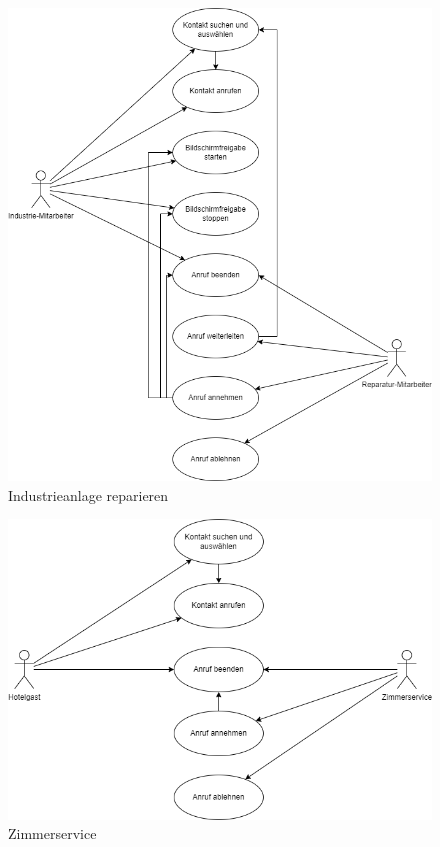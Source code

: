 \begin{figure}[ht!]
    \includegraphics[width=\paperwidth-2in]{../assets/img/UML-Anwendungsfalldiagramme-Industrieanlage reparieren.drawio}
    \caption{Industrieanlage reparieren}
    \label{fig:industrieanlage-reparieren}
\end{figure}

\begin{figure}[ht!]
    \includegraphics[width=\paperwidth-2in]{../assets/img/UML-Anwendungsfalldiagramme-Zimmerservice.drawio}
    \caption{Zimmerservice}
    \label{fig:zimmerservice}
\end{figure}



